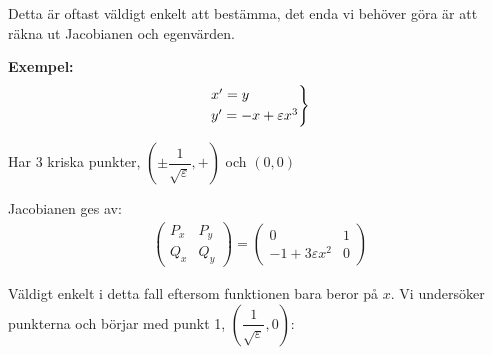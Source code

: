 \par\bigskip
\noindent Detta är oftast väldigt enkelt att bestämma, det enda vi behöver göra är att räkna ut Jacobianen och egenvärden.
\par\bigskip
\noindent\textbf{Exempel:}
\begin{equation*}
  \begin{gathered}
    \begin{rcases*}
      x^{\prime} = y\\
      y^{\prime} = -x+\varepsilon x^3
    \end{rcases*}
  \end{gathered}
\end{equation*}\par
\noindent Har 3 kriska punkter, $\left(\pm\dfrac{1}{\sqrt{\varepsilon}},+\right)$ och $(0,0)$
\par\bigskip
\noindent Jacobianen ges av:
\begin{equation*}
  \begin{gathered}
    \begin{pmatrix}P_x&P_y\\Q_x&Q_y\end{pmatrix} = \begin{pmatrix}0&1\\-1+3\varepsilon x^2&0\end{pmatrix}
  \end{gathered}
\end{equation*}\par
\noindent Väldigt enkelt i detta fall eftersom funktionen bara beror på $x$. Vi undersöker punkterna och börjar med punkt 1, $\left(\dfrac{1}{\sqrt{\varepsilon}}, 0\right)$:\par

